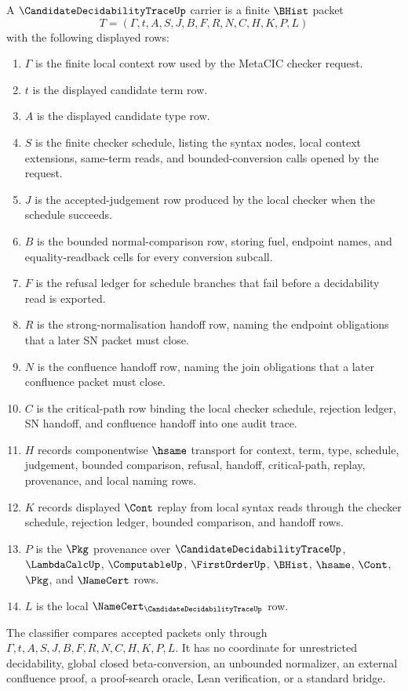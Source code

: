 \begin{definition}
\label{def:candidate-decidability-trace-carrier}
A $\CandidateDecidabilityTraceUp$ carrier is a finite $\BHist$ packet
$$
T=(\Gamma,t,A,S,J,B,F,R,N,C,H,K,P,L)
$$
with the following displayed rows:
\begin{enumerate}
\item $\Gamma$ is the finite local context row used by the MetaCIC checker request.
\item $t$ is the displayed candidate term row.
\item $A$ is the displayed candidate type row.
\item $S$ is the finite checker schedule, listing the syntax nodes, local context extensions, same-term reads, and bounded-conversion calls opened by the request.
\item $J$ is the accepted-judgement row produced by the local checker when the schedule succeeds.
\item $B$ is the bounded normal-comparison row, storing fuel, endpoint names, and equality-readback cells for every conversion subcall.
\item $F$ is the refusal ledger for schedule branches that fail before a decidability read is exported.
\item $R$ is the strong-normalisation handoff row, naming the endpoint obligations that a later SN packet must close.
\item $N$ is the confluence handoff row, naming the join obligations that a later confluence packet must close.
\item $C$ is the critical-path row binding the local checker schedule, rejection ledger, SN handoff, and confluence handoff into one audit trace.
\item $H$ records componentwise $\hsame$ transport for context, term, type, schedule, judgement, bounded comparison, refusal, handoff, critical-path, replay, provenance, and local naming rows.
\item $K$ records displayed $\Cont$ replay from local syntax reads through the checker schedule, rejection ledger, bounded comparison, and handoff rows.
\item $P$ is the $\Pkg$ provenance over $\CandidateDecidabilityTraceUp$, $\LambdaCalcUp$, $\ComputableUp$, $\FirstOrderUp$, $\BHist$, $\hsame$, $\Cont$, $\Pkg$, and $\NameCert$ rows.
\item $L$ is the local $\NameCert_{\CandidateDecidabilityTraceUp}$ row.
\end{enumerate}
The classifier compares accepted packets only through $\Gamma,t,A,S,J,B,F,R,N,C,H,K,P,L$. It has no coordinate for unrestricted decidability, global closed beta-conversion, an unbounded normalizer, an external confluence proof, a proof-search oracle, Lean verification, or a standard bridge.
\end{definition}

